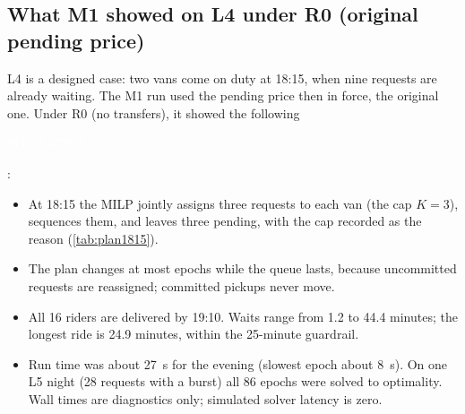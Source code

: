 \documentclass[11pt,letterpaper]{article}
\newcommand{\marker}[2]{{\setlength{\fboxsep}{1.4pt}\colorbox{#1}{\textcolor{white}{\sffamily\bfseries\scriptsize\strut #2}}}}
\newcommand{\Simulated}{\marker{cSim}{SIMULATED}}
\begin{document}
\subsection{What M1 showed on L4 under R0 (original pending price)}
L4 is a designed case: two vans come on duty at 18:15, when nine requests are already waiting. The M1 run used the pending price then in force, the original one. Under R0 (no transfers), it showed the following \Simulated:
\begin{itemize}
\item At 18:15 the MILP jointly assigns three requests to each van (the cap $K = 3$), sequences them, and leaves three pending, with the cap recorded as the reason (\cref{tab:plan1815}).
\item The plan changes at most epochs while the queue lasts, because uncommitted requests are reassigned; committed pickups never move.
\item All 16 riders are delivered by 19:10. Waits range from 1.2 to 44.4 minutes; the longest ride is 24.9 minutes, within the 25-minute guardrail.
\item Run time was about 27~s for the evening (slowest epoch about 8~s). On one L5 night (28 requests with a burst) all 86 epochs were solved to optimality. Wall times are diagnostics only; simulated solver latency is zero.
\end{itemize}
\end{document}
